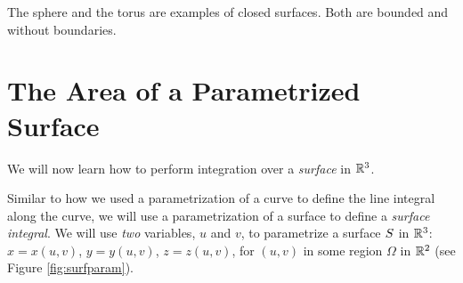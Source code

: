 \begin{exa}
\begin{exa} The sphere and the torus are examples of closed surfaces. Both are bounded and without boundaries.
\end{exa}
%
%
%




\end{exa}

\section{The Area of a Parametrized Surface}


We will now learn how to perform integration over a
\emph{surface} in $\mathbb{R}^{3}$.


Similar to how we used a parametrization of a curve to define the line integral along the curve, we will use a
parametrization of a surface to define a \emph{surface integral}. We will use \emph{two} variables, $u$ and $v$,
to parametrize a surface $S$ in $\mathbb{R}^{3}$: $x=x(u,v)$, $y=y(u,v)$, $z=z(u,v)$, for $(u,v)$ in some region $\Omega$ in
$\mathbb{R}^{2}$ (see Figure \ref{fig:surfparam}).



